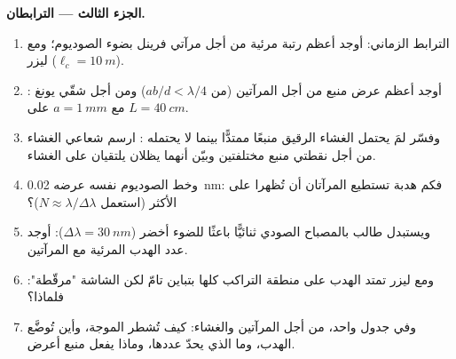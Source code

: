 \begin{problem}
\medskip
\noindent\textbf{الجزء الثالث --- الترابطان.}
\begin{enumerate}[resume]
  \item الترابط الزماني: أوجد أعظم رتبة مرئية من أجل مرآتي فرينل
        بضوء الصوديوم؛ ومع ليزر ($\ell_c = \qty{10}{m}$).
  \item {}: أوجد أعظم عرض منبع من أجل المرآتين
        (من $ab/d < \lambda/4$) ومن أجل شقّي يونغ مع $a = \qty{1}{mm}$ على
        $L = \qty{40}{cm}$.
  \item وفسّر لمَ يحتمل الغشاء الرقيق منبعًا ممتدًّا بينما
        لا يحتمله : ارسم شعاعي الغشاء من أجل نقطتي منبع
        مختلفتين وبيّن أنهما يظلان يلتقيان على الغشاء.
  \item وخط الصوديوم نفسه عرضه \qty{0.02}{nm}: فكم هدبة
        تستطيع المرآتان أن تُظهرا على الأكثر (استعمل $N \approx \lambda/\Delta\lambda$)؟
  \item ويستبدل طالب بالمصباح الصودي ثنائيًّا باعثًا للضوء أخضر ($\Delta\lambda =
        \qty{30}{nm}$): أوجد عدد الهدب المرئية مع المرآتين.
  \item ومع ليزر تمتد الهدب على منطقة التراكب كلها
        بتباين تامّ لكن الشاشة "مرقّطة": فلماذا؟
  \item وفي جدول واحد، من أجل المرآتين والغشاء: كيف تُشطر الموجة،
        وأين تُوضَّع الهدب، وما الذي يحدّ عددها،
        وماذا يفعل منبع أعرض.
\end{enumerate}
\end{problem}
